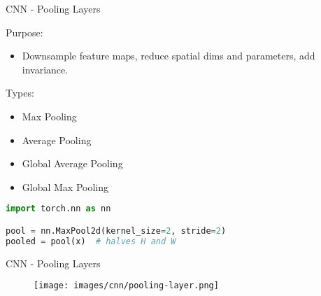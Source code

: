 \begin{frame}[fragile]{CNN - Pooling Layers}
\begin{block}{Purpose:}
    \begin{itemize}
        \item Downsample feature maps, reduce spatial dims and parameters, add invariance.
    \end{itemize}
\end{block}

\begin{block}{Types:}
    \begin{itemize}
        \item Max Pooling
        \item Average Pooling
        \item Global Average Pooling
        \item Global Max Pooling
    \end{itemize}
\end{block}

\begin{lstlisting}[language=Python, caption={Code snippet (PyTorch)}, basicstyle=\ttfamily\footnotesize]
import torch.nn as nn

pool = nn.MaxPool2d(kernel_size=2, stride=2)
pooled = pool(x)  # halves H and W
\end{lstlisting}
\end{frame}  

\begin{frame}{CNN - Pooling Layers}
    \begin{figure}
    \centering
    \texttt{[image: images/cnn/pooling-layer.png]}
    \end{figure}
\end{frame}